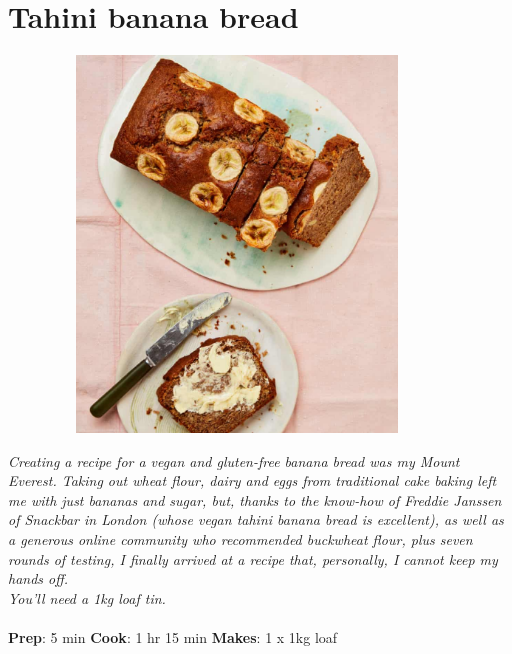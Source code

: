 \documentclass{book}
\begin{document}
\section{Tahini banana bread}
\begin{figure}
\centering\includegraphics[width=10cm,height=10cm,keepaspectratio]{Recipe_Pictures/Tahini_banana_bread.png}
\end{figure}
\emph{Creating a recipe for a vegan and gluten-free banana bread was my Mount Everest. Taking out wheat flour, dairy and eggs from traditional cake baking left me with just bananas and sugar, but, thanks to the know-how of Freddie Janssen of Snackbar in London (whose vegan tahini banana bread is excellent), as well as a generous online community who recommended buckwheat flour, plus seven rounds of testing, I finally arrived at a recipe that, personally, I cannot keep my hands off.\\ 
You’ll need a 1kg loaf tin.}\\\\ 
\textbf{Prep}: 5 min
\textbf{Cook}: 1 hr 15 min
\textbf{Makes}: 1 x 1kg loaf
\end{document}
